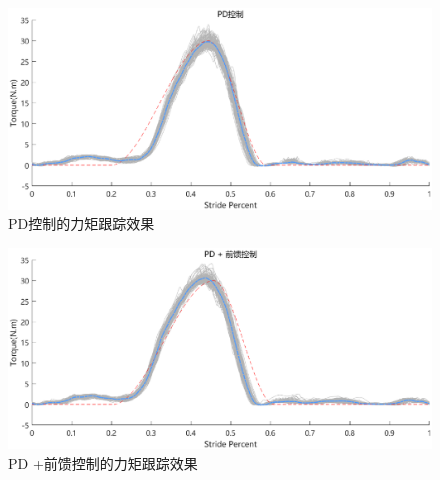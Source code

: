 \begin{figure}[htb]
    \includegraphics[width=17cm]{fig/f56.eps}
    \caption{PD控制的力矩跟踪效果}
    \label{fig:mark}
\end{figure}
\begin{figure}[!htb]
    \includegraphics[width=17cm]{fig/f57.eps}
    \caption{PD +前馈控制的力矩跟踪效果}
    \label{fig:mark}
\end{figure}

